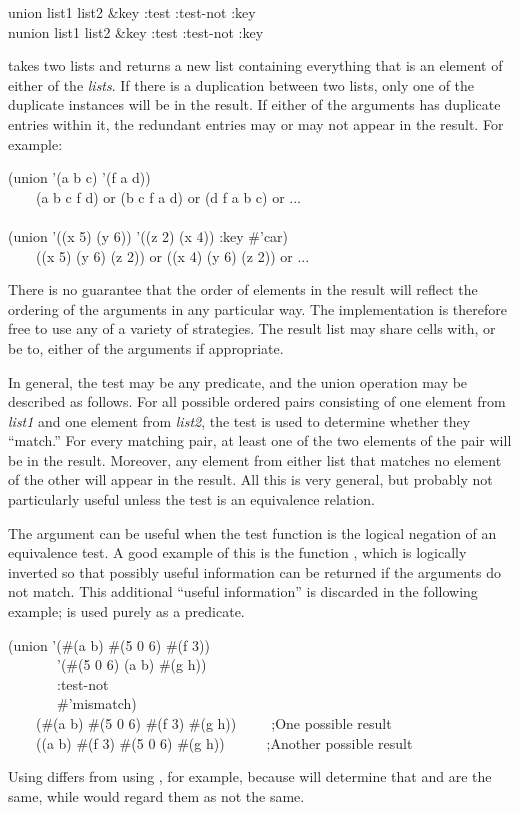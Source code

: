 \begin{defun}[Function]
union list1 list2 &key :test :test-not :key \\
nunion list1 list2 &key :test :test-not :key

 takes two lists and returns a new list containing
everything that is an element of either of the {\it lists}.
If there is a duplication between two lists,
only one of the duplicate instances will be in the result.
If either of the arguments has duplicate entries within it,
the redundant entries
may or may not appear in the result.
For example:
\begin{lisp}
(union '(a b c) '(f a d)) \\
~~~\EV\ (a b c f d) {\rm or} (b c f a d) {\rm or} (d f a b c) {\rm or} ... \\
 \\
(union '((x 5) (y 6)) '((z 2) (x 4)) :key \#'car) \\
~~~\EV\ ((x 5) (y 6) (z 2)) {\rm or} ((x 4) (y 6) (z 2)) {\rm or} ...
\end{lisp}

There is no guarantee that the order of elements in the result will
reflect the ordering of the arguments in any particular way.
The implementation is therefore free to use any of a variety of strategies.
The result list may share cells with, or be  to, either of the arguments
if appropriate.

In general, the test may be any predicate, and the union operation may be
described as follows.  For all possible ordered pairs consisting of one
element from {\it list1} and one element from {\it list2}, the test is used
to determine whether they ``match.''  For every matching pair, at least
one of the two elements of the pair will be in the result.  Moreover, any
element from either list that matches no element of the other will appear
in the result.  All this is very general, but probably not particularly
useful unless the test is an equivalence relation.

The  argument can be useful when the test function
is the logical negation of an equivalence test.  A good example
of this is the function , which is logically inverted
so that possibly useful information can be returned if the arguments do not
match.  This additional ``useful information'' is discarded in the following
example;  is used purely as a predicate.
\begin{lisp}
(union '(\#(a b) \#(5 0 6) \#(f 3)) \\
~~~~~~~'(\#(5 0 6) (a b) \#(g h)) \\
~~~~~~~:test-not \\
~~~~~~~\#'mismatch) \\
~~~\EV\ (\#(a b) \#(5 0 6) \#(f 3) \#(g h))~~~~~;{\rm One possible result} \\
~~~\EV\ ((a b) \#(f 3) \#(5 0 6) \#(g h))~~~~~~;{\rm Another possible result}
\end{lisp}
Using  differs from using
, for example, because 
will determine that  and  are the same,
while  would regard them as not the same.


\end{defun}
